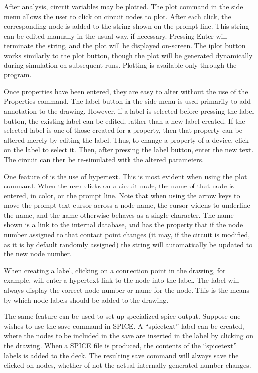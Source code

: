 After {\WRspice} analysis, circuit variables may be plotted.  The {\cb
plot} command in the side menu allows the user to click on circuit
nodes to plot.  After each click, the corresponding node is added to
the string shown on the prompt line.  This string can be edited
manually in the usual way, if necessary.  Pressing {\kb Enter} will
terminate the string, and the plot will be displayed on-screen.  The
{\cb iplot} button works similarly to the {\cb plot} button, though
the plot will be generated dynamically during simulation on subsequent
runs.  Plotting is available only through the {\WRspice} program.

Once properties have been entered, they are easy to alter without the
use of the {\cb Properties} command.  The {\cb label} button in the
side menu is used primarily to add annotation to the drawing. 
However, if a label is selected before pressing the {\cb label}
button, the existing label can be edited, rather than a new label
created.  If the selected label is one of those created for a
property, then that property can be altered merely by editing the
label.  Thus, to change a property of a device, click on the label to
select it.  Then, after pressing the {\cb label} button, enter the new
text.  The circuit can then be re-simulated with the altered
parameters.

One feature of {\Xic} is the use of hypertext.  This is most evident
when using the {\cb plot} command.  When the user clicks on a circuit
node, the name of that node is entered, in color, on the prompt line.
Note that when using the arrow keys to move the prompt text cursor
across a node name, the cursor widens to underline the name, and the
name otherwise behaves as a single character.  The name shown is a
link to the internal database, and has the property that if the node
number assigned to that contact point changes (it may, if the circuit is
modified, as it is by default randomly assigned) the string will
automatically be updated to the new node number.

When creating a label, clicking on a connection point in the drawing,
for example, will enter a hypertext link to the node into the label. 
The label will always display the correct node number or name for the
node.  This is the means by which node labels should be added to the
drawing.

The same feature can be used to set up specialized spice output. 
Suppose one wishes to use the {\cb save} command in SPICE.  A
``spicetext'' label can be created, where the nodes to be included in
the save are inserted in the label by clicking on the drawing.  When a
SPICE file is produced, the contents of the ``spicetext'' labels is
added to the deck.  The resulting save command will always save the
clicked-on nodes, whether of not the actual internally generated
number changes.

